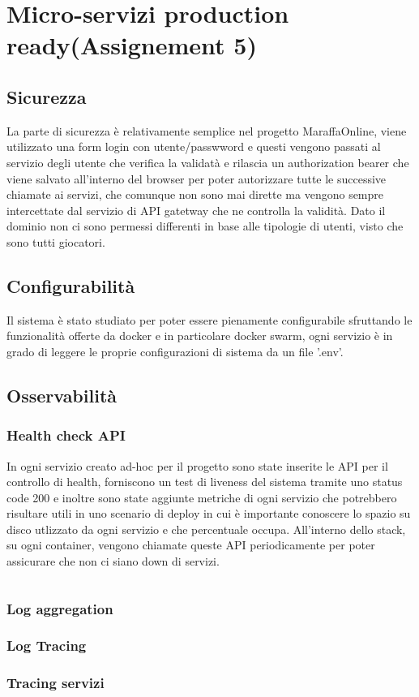 \chapter{Micro-servizi production ready(Assignement 5)}
\label{ch:production_ready}

\section{Sicurezza}

La parte di sicurezza è relativamente semplice nel progetto MaraffaOnline, viene utilizzato una form login con utente/passwword e questi vengono passati al servizio degli utente che verifica la validatà e rilascia un authorization bearer che viene salvato all'interno del browser per poter autorizzare tutte le successive chiamate ai servizi, che comunque non sono mai dirette ma vengono sempre intercettate dal servizio di API gatetway che ne controlla la validità. 
Dato il dominio non ci sono permessi differenti in base alle tipologie di utenti, visto che sono tutti giocatori.

\section{Configurabilità}

Il sistema è stato studiato per poter essere pienamente configurabile sfruttando le funzionalità offerte da docker e in particolare docker swarm, ogni servizio è in grado di leggere le proprie configurazioni di sistema da un file '.env'.

\section{Osservabilità}

\subsection{Health check API}

In ogni servizio creato ad-hoc per il progetto sono state inserite le API per il controllo di health, forniscono un test di liveness del sistema tramite uno status code 200 e inoltre sono state aggiunte metriche di ogni servizio che potrebbero risultare utili in uno scenario di deploy in cui è importante conoscere lo spazio su disco utlizzato da ogni servizio e che percentuale occupa. 
All'interno dello stack, su ogni container, vengono chiamate queste API periodicamente per poter assicurare che non ci siano down di servizi.

\begin{lstlisting}[language=Yaml, caption={Health check API}, label=list:healt_API]
    %%TODO 
\end{lstlisting}


\subsection{Log aggregation}

\subsection{Log Tracing}


\subsection{Tracing servizi}